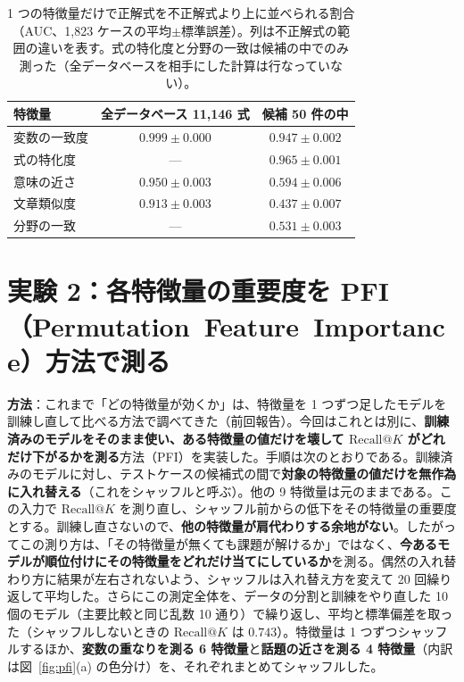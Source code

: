 \documentclass[11pt,a4paper]{ltjsarticle}
\makeatletter
\newcommand{\rk}{\textrm{Recall@}K}
\makeatother
\begin{document}
\begin{table}[h]\centering
\small
\caption{1 つの特徴量だけで正解式を不正解式より上に並べられる割合（AUC、1{,}823 ケースの平均$\pm$標準誤差）。列は不正解式の範囲の違いを表す。式の特化度と分野の一致は候補の中でのみ測った（全データベースを相手にした計算は行なっていない）。}
\label{tab:auc}
\begin{tabular}{lcc}
\toprule
特徴量 & 全データベース 11{,}146 式 & 候補 50 件の中 \\
\midrule
変数の一致度 & $0.999 \pm 0.000$ & $0.947 \pm 0.002$ \\
式の特化度 & — & $0.965 \pm 0.001$ \\
\midrule
意味の近さ & $0.950 \pm 0.003$ & $0.594 \pm 0.006$ \\
文章類似度 & $0.913 \pm 0.003$ & $0.437 \pm 0.007$ \\
分野の一致 & — & $0.531 \pm 0.003$ \\
\bottomrule
\end{tabular}
\end{table}

\section{実験 2：各特徴量の重要度を \mbox{PFI（Permutation Feature Importance）}方法で測る}\label{sec:exp2}
\textbf{方法}：これまで「どの特徴量が効くか」は、特徴量を 1 つずつ足したモデルを訓練し直して比べる方法で調べてきた（前回報告）。今回はこれとは別に、\textbf{訓練済みのモデルをそのまま使い、ある特徴量の値だけを壊して $\rk$ がどれだけ下がるかを測る}方法（PFI）を実装した。手順は次のとおりである。訓練済みのモデルに対し、テストケースの候補式の間で\textbf{対象の特徴量の値だけを無作為に入れ替える}（これをシャッフルと呼ぶ）。他の 9 特徴量は元のままである。この入力で $\rk$ を測り直し、シャッフル前からの低下をその特徴量の重要度とする。訓練し直さないので、\textbf{他の特徴量が肩代わりする余地がない}。したがってこの測り方は、「その特徴量が無くても課題が解けるか」ではなく、\textbf{今あるモデルが順位付けにその特徴量をどれだけ当てにしているか}を測る。偶然の入れ替わり方に結果が左右されないよう、シャッフルは入れ替え方を変えて 20 回繰り返して平均した。さらにこの測定全体を、データの分割と訓練をやり直した 10 個のモデル（主要比較と同じ乱数 10 通り）で繰り返し、平均と標準偏差を取った（シャッフルしないときの $\rk$ は $0.743$）。特徴量は 1 つずつシャッフルするほか、\textbf{変数の重なりを測る 6 特徴量}と\textbf{話題の近さを測る 4 特徴量}（内訳は図~\ref{fig:pfi}(a) の色分け）を、それぞれまとめてシャッフルした。
\end{document}
